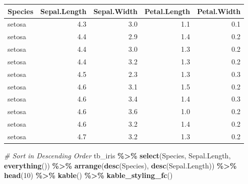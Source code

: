 \documentclass[
]{book}
\newenvironment{Shaded}{\begin{snugshade}}{\end{snugshade}}
\newcommand{\CommentTok}[1]{\textcolor[rgb]{0.56,0.35,0.01}{\textit{#1}}}
\newcommand{\DecValTok}[1]{\textcolor[rgb]{0.00,0.00,0.81}{#1}}
\newcommand{\KeywordTok}[1]{\textcolor[rgb]{0.13,0.29,0.53}{\textbf{#1}}}
\newcommand{\NormalTok}[1]{#1}
\newcommand{\OperatorTok}[1]{\textcolor[rgb]{0.81,0.36,0.00}{\textbf{#1}}}
\newcommand{\StringTok}[1]{\textcolor[rgb]{0.31,0.60,0.02}{#1}}
\begin{document}
\begin{table}[!h]
\centering
\begin{tabular}{l|r|r|r|r}
\hline
Species & Sepal.Length & Sepal.Width & Petal.Length & Petal.Width\\
\hline
\rowcolor{gray!6}  setosa & 4.3 & 3.0 & 1.1 & 0.1\\
\hline
setosa & 4.4 & 2.9 & 1.4 & 0.2\\
\hline
\rowcolor{gray!6}  setosa & 4.4 & 3.0 & 1.3 & 0.2\\
\hline
setosa & 4.4 & 3.2 & 1.3 & 0.2\\
\hline
\rowcolor{gray!6}  setosa & 4.5 & 2.3 & 1.3 & 0.3\\
\hline
setosa & 4.6 & 3.1 & 1.5 & 0.2\\
\hline
\rowcolor{gray!6}  setosa & 4.6 & 3.4 & 1.4 & 0.3\\
\hline
setosa & 4.6 & 3.6 & 1.0 & 0.2\\
\hline
\rowcolor{gray!6}  setosa & 4.6 & 3.2 & 1.4 & 0.2\\
\hline
setosa & 4.7 & 3.2 & 1.3 & 0.2\\
\hline
\end{tabular}
\end{table}

\begin{Shaded}
\begin{Highlighting}[]
\CommentTok{\# Sort in Descending Order}
\NormalTok{tb\_iris }\OperatorTok{\%\textgreater{}\%}\StringTok{ }\KeywordTok{select}\NormalTok{(Species, Sepal.Length, }\KeywordTok{everything}\NormalTok{()) }\OperatorTok{\%\textgreater{}\%}
\StringTok{  }\KeywordTok{arrange}\NormalTok{(}\KeywordTok{desc}\NormalTok{(Species), }\KeywordTok{desc}\NormalTok{(Sepal.Length)) }\OperatorTok{\%\textgreater{}\%}\StringTok{ }\KeywordTok{head}\NormalTok{(}\DecValTok{10}\NormalTok{) }\OperatorTok{\%\textgreater{}\%}
\StringTok{  }\KeywordTok{kable}\NormalTok{() }\OperatorTok{\%\textgreater{}\%}\StringTok{ }\KeywordTok{kable\_styling\_fc}\NormalTok{()}
\end{Highlighting}
\end{Shaded}
\end{document}
